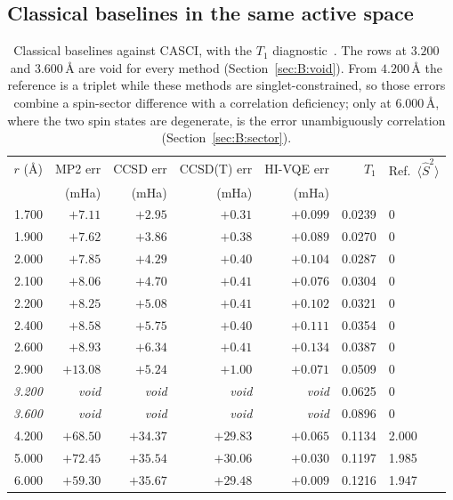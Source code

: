 \documentclass[11pt,a4paper]{article}
\newcommand{\Ang}{\ensuremath{\,\text{\AA}}}
\newcommand{\Ssq}{\ensuremath{\langle \hat{S}^2 \rangle}}
\begin{document}
\subsection{Classical baselines in the same active space}
\label{sec:B:classical}

\begin{table}[htbp]
\centering
\small
\caption{Classical baselines against CASCI, with the $T_1$
diagnostic~\cite{t1}. The rows at $3.200$ and $3.600\Ang$ are void for every
method (Section~\ref{sec:B:void}). From $4.200\Ang$ the reference is a triplet
while these methods are singlet-constrained, so those errors combine a
spin-sector difference with a correlation deficiency; only at $6.000\Ang$,
where the two spin states are degenerate, is the error unambiguously
correlation (Section~\ref{sec:B:sector}).}
\label{tab:B:classical}
\begin{tabular}{@{}rrrrrrl@{}}
\toprule
$r$ (\AA) & MP2 err & CCSD err & CCSD(T) err & HI-VQE err & $T_1$ & Ref.\ $\Ssq$ \\
 & (mHa) & (mHa) & (mHa) & (mHa) & & \\
\midrule
1.700 & $+7.11$  & $+2.95$  & $+0.31$  & $+0.099$ & 0.0239 & 0 \\
1.900 & $+7.62$  & $+3.86$  & $+0.38$  & $+0.089$ & 0.0270 & 0 \\
2.000 & $+7.85$  & $+4.29$  & $+0.40$  & $+0.104$ & 0.0287 & 0 \\
2.100 & $+8.06$  & $+4.70$  & $+0.41$  & $+0.076$ & 0.0304 & 0 \\
2.200 & $+8.25$  & $+5.08$  & $+0.41$  & $+0.102$ & 0.0321 & 0 \\
2.400 & $+8.58$  & $+5.75$  & $+0.40$  & $+0.111$ & 0.0354 & 0 \\
2.600 & $+8.93$  & $+6.34$  & $+0.41$  & $+0.134$ & 0.0387 & 0 \\
2.900 & $+13.08$ & $+5.24$  & $+1.00$  & $+0.071$ & 0.0509 & 0 \\
\midrule
\emph{3.200} & \emph{void} & \emph{void} & \emph{void} & \emph{void} & 0.0625 & 0 \\
\emph{3.600} & \emph{void} & \emph{void} & \emph{void} & \emph{void} & 0.0896 & 0 \\
\midrule
4.200 & $+68.50$ & $+34.37$ & $+29.83$ & $+0.065$ & 0.1134 & 2.000 \\
5.000 & $+72.45$ & $+35.54$ & $+30.06$ & $+0.030$ & 0.1197 & 1.985 \\
6.000 & $+59.30$ & $+35.67$ & $+29.48$ & $+0.009$ & 0.1216 & 1.947 \\
\bottomrule
\end{tabular}
\end{table}
\end{document}
